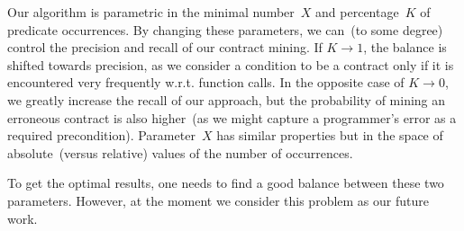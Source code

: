 Our algorithm is parametric in the minimal number~$X$ and percentage~$K$ of predicate occurrences. By changing these parameters, we can~(to some degree) control the precision and recall of our contract mining. If $K \rightarrow 1$, the balance is shifted towards precision, as we consider a condition to be a contract only if it is encountered very frequently w.r.t. function calls. In the opposite case of $K \rightarrow 0$, we greatly increase the recall of our approach, but the probability of mining an erroneous contract is also higher~(as we might capture a programmer's error as a required precondition). Parameter~$X$ has similar properties but in the space of absolute~(versus relative) values of the number of occurrences.

To get the optimal results, one needs to find a good balance between these two parameters. However, at the moment we consider this problem as our future work.
